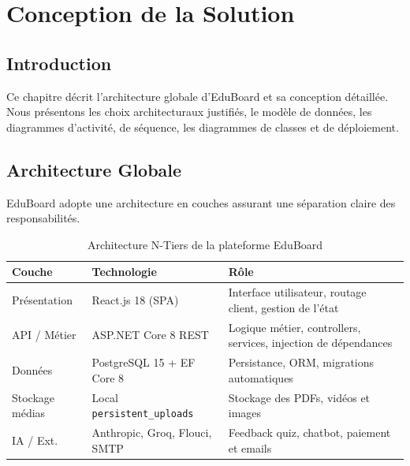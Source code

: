 \chapter{Conception de la Solution}

\section*{Introduction}

Ce chapitre décrit l'architecture globale d'EduBoard et sa conception détaillée. Nous
présentons les choix architecturaux justifiés, le modèle de données, les diagrammes
d'activité, de séquence, les diagrammes de classes et de déploiement.
\section{Architecture Globale}

EduBoard adopte une architecture en couches assurant une séparation claire des responsabilités.

\begin{table}[H]
  \centering
  \caption{Architecture N-Tiers de la plateforme EduBoard}
  \label{tab:architecture}
  \renewcommand{\arraystretch}{1.3}
  \begin{tabularx}{\textwidth}{>{\raggedright\arraybackslash}p{3.5cm} p{4cm} X}
    \toprule
    \textbf{Couche} & \textbf{Technologie} & \textbf{Rôle} \\
    \midrule
    Présentation & React.js 18 (\ac{SPA}) & Interface utilisateur, routage client, gestion de l'état \\
    API / Métier & ASP.NET Core 8 \ac{REST} & Logique métier, controllers, services, injection de dépendances \\
    Données & PostgreSQL 15 + EF Core 8 & Persistance, \ac{ORM}, migrations automatiques \\
    Stockage médias & Local \texttt{persistent\_uploads} & Stockage des PDFs, vidéos et images \\
    IA / Ext. & Anthropic, Groq, Flouci, SMTP & Feedback quiz, chatbot, paiement et emails \\
    \bottomrule
  \end{tabularx}
\end{table}

